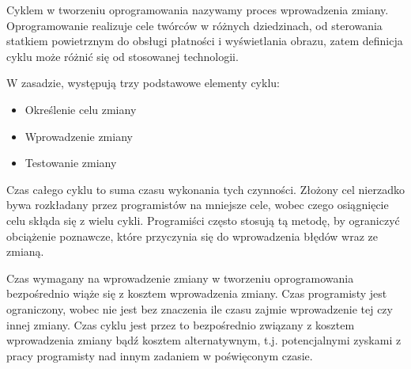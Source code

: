 Cyklem w tworzeniu oprogramowania nazywamy proces wprowadzenia zmiany.
Oprogramowanie realizuje cele twórców w różnych dziedzinach, od sterowania statkiem powietrznym
do obsługi płatności i wyświetlania obrazu, zatem definicja cyklu może różnić się od stosowanej technologii.

W zasadzie, występują trzy podstawowe elementy cyklu:
\begin{itemize}
    \item Określenie celu zmiany
    \item Wprowadzenie zmiany
    \item Testowanie zmiany
\end{itemize}

Czas całego cyklu to suma czasu wykonania tych czynności.
Złożony cel nierzadko bywa rozkładany przez programistów na mniejsze cele, wobec
czego osiągnięcie celu skłąda się z wielu cykli.
Programiści często stosują tą metodę, by ograniczyć obciążenie poznawcze, które przyczynia się do
wprowadzenia błędów wraz ze zmianą.


Czas wymagany na wprowadzenie zmiany w tworzeniu oprogramowania bezpośrednio wiąże się z kosztem
wprowadzenia zmiany.
Czas programisty jest ograniczony, wobec nie jest bez znaczenia ile czasu zajmie wprowadzenie
tej czy innej zmiany.
Czas cyklu jest przez to bezpośrednio związany z kosztem wprowadzenia zmiany bądź kosztem alternatywnym,
t.j. potencjalnymi zyskami z pracy programisty nad innym zadaniem w poświęconym czasie.

